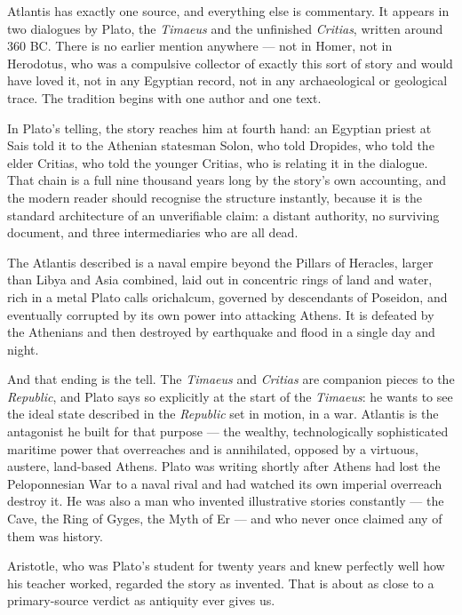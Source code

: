 Atlantis has exactly one source, and everything else is commentary. It appears in two dialogues by
Plato, the \emph{Timaeus} and the unfinished \emph{Critias}, written around 360 BC. There is no
earlier mention anywhere --- not in Homer, not in Herodotus, who was a compulsive collector of
exactly this sort of story and would have loved it, not in any Egyptian record, not in any
archaeological or geological trace. The tradition begins with one author and one text.

In Plato's telling, the story reaches him at fourth hand: an Egyptian priest at Sais told it to the
Athenian statesman Solon, who told Dropides, who told the elder Critias, who told the younger
Critias, who is relating it in the dialogue. That chain is a full nine thousand years long by the
story's own accounting, and the modern reader should recognise the structure instantly, because it is
the standard architecture of an unverifiable claim: a distant authority, no surviving document, and
three intermediaries who are all dead.

The Atlantis described is a naval empire beyond the Pillars of Heracles, larger than Libya and Asia
combined, laid out in concentric rings of land and water, rich in a metal Plato calls orichalcum,
governed by descendants of Poseidon, and eventually corrupted by its own power into attacking
Athens. It is defeated by the Athenians and then destroyed by earthquake and flood in a single day
and night.

And that ending is the tell. The \emph{Timaeus} and \emph{Critias} are companion pieces to the
\emph{Republic}, and Plato says so explicitly at the start of the \emph{Timaeus}: he wants to see the
ideal state described in the \emph{Republic} set in motion, in a war. Atlantis is the antagonist he
built for that purpose --- the wealthy, technologically sophisticated maritime power that overreaches
and is annihilated, opposed by a virtuous, austere, land-based Athens. Plato was writing shortly
after Athens had lost the Peloponnesian War to a naval rival and had watched its own imperial
overreach destroy it. He was also a man who invented illustrative stories constantly --- the Cave,
the Ring of Gyges, the Myth of Er --- and who never once claimed any of them was history.

Aristotle, who was Plato's student for twenty years and knew perfectly well how his teacher worked,
regarded the story as invented. That is about as close to a primary-source verdict as antiquity ever
gives us.


